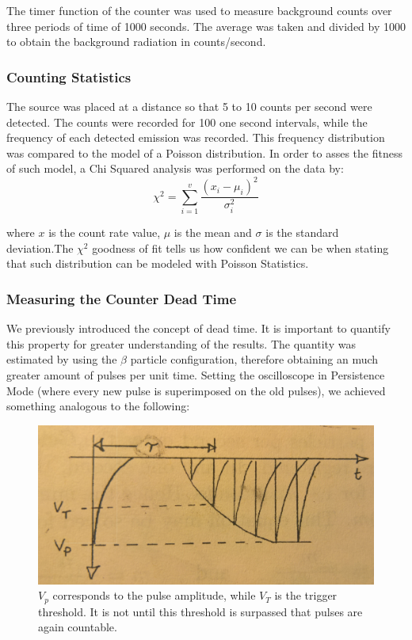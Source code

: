 \documentclass[a4paper]{article}
\begin{document}
  The timer function of the counter was used to measure background counts over three periods of time of 1000 seconds. The average was taken and divided by 1000 to obtain the background radiation in counts/second.
  \subsubsection{Counting Statistics}
  The source was placed at a distance so that 5 to 10 counts per second were detected. The counts were recorded for 100 one second intervals, while the frequency of each detected emission was recorded.
This frequency distribution was compared to the model of a Poisson distribution. In order to asses the fitness of such model, a Chi Squared analysis was performed
on the data by:
\begin{equation} 
  \label{chisquared} 
\chi^{2}=\sum_{i=1}^{v} \frac{(x_i-\mu_i)^{2}}{\sigma_i^{2}}
  \end{equation} 
 
  where  $x$ is the count rate value, $\mu$ is the mean and $\sigma$ is the standard deviation.The $\chi^{2}$ goodness of fit tells us how confident we can be when stating that such distribution can be modeled with Poisson Statistics.
\subsubsection{Measuring the Counter Dead Time}
  We previously introduced the concept of dead time. It is important to quantify this property for greater understanding of the results. The quantity was estimated by using the $\beta$ particle configuration, therefore obtaining an much greater amount of pulses per unit time. Setting the oscilloscope in Persistence Mode (where every new pulse is superimposed on the old pulses), we achieved something analogous to the following:
  
  \begin{figure}[h]
  \includegraphics[scale=0.05]{deadtime} 
  \centering
  \caption{$V_p$ corresponds to the pulse amplitude, while $V_T$ is the trigger threshold. It is not until this threshold is surpassed that pulses are again countable.}
  \end{figure}
  
\end{document}
